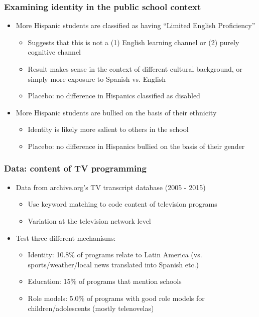 \documentclass{beamer}
\begin{document}
\begin{frame}
\frametitle{Examining identity in the public school context}
\begin{itemize}
\item More Hispanic students are classified as having ``Limited English Proficiency''
\begin{itemize}
\item Suggests that this is not a (1) English learning channel or (2) purely cognitive channel
\item Result makes sense in the context of different cultural background, or simply more exposure to Spanish vs. English
\item Placebo: no difference in Hispanics classified as disabled
\end{itemize}
\item More Hispanic students are bullied on the basis of their ethnicity
\begin{itemize}
\item Identity is likely more salient to others in the school
\item Placebo: no difference in Hispanics bullied on the basis of their gender
\end{itemize}
\end{itemize}
\end{frame}

\begin{frame}
\frametitle{Data: content of TV programming}
\begin{itemize}
\item Data from archive.org's TV transcript database (2005 - 2015)
\begin{itemize}
\item Use keyword matching to code content of television programs
\item Variation at the television network level
\end{itemize}
\item Test three different mechanisms:
\begin{itemize}
\item Identity: 10.8\% of programs relate to Latin America (vs. sports/weather/local news translated into Spanish etc.)
\item Education: 15\% of programs that mention schools
\item Role models: 5.0\% of programs with good role models for children/adolescents (mostly telenovelas)
\end{itemize}
\end{itemize}
\end{frame}
\end{document}
